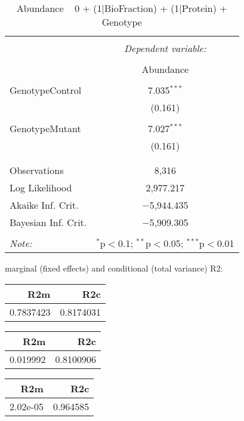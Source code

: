 \documentclass[11pt]{report}
\begin{document}
\begin{table}[!htbp] \centering 
  \caption{Abundance ~ 0 + (1|BioFraction) + (1|Protein) + Genotype} 
  \label{} 
\begin{tabular}{@{\extracolsep{5pt}}lc} 
\\[-1.8ex]\hline 
\hline \\[-1.8ex] 
 & \multicolumn{1}{c}{\textit{Dependent variable:}} \\ 
\cline{2-2} 
\\[-1.8ex] & Abundance \\ 
\hline \\[-1.8ex] 
 GenotypeControl & 7.035$^{***}$ \\ 
  & (0.161) \\ 
  & \\ 
 GenotypeMutant & 7.027$^{***}$ \\ 
  & (0.161) \\ 
  & \\ 
\hline \\[-1.8ex] 
Observations & 8,316 \\ 
Log Likelihood & 2,977.217 \\ 
Akaike Inf. Crit. & $-$5,944.435 \\ 
Bayesian Inf. Crit. & $-$5,909.305 \\ 
\hline 
\hline \\[-1.8ex] 
\textit{Note:}  & \multicolumn{1}{r}{$^{*}$p$<$0.1; $^{**}$p$<$0.05; $^{***}$p$<$0.01} \\ 
\end{tabular} 
\end{table} 
marginal (fixed effects) and conditional (total variance) R2:

\begin{tabular}{r|r}
\hline
R2m & R2c\\
\hline
0.7837423 & 0.8174031\\
\hline
\end{tabular}

\begin{tabular}{r|r}
\hline
R2m & R2c\\
\hline
0.019992 & 0.8100906\\
\hline
\end{tabular}

\begin{tabular}{r|r}
\hline
R2m & R2c\\
\hline
2.02e-05 & 0.964585\\
\hline
\end{tabular}
\end{document}

